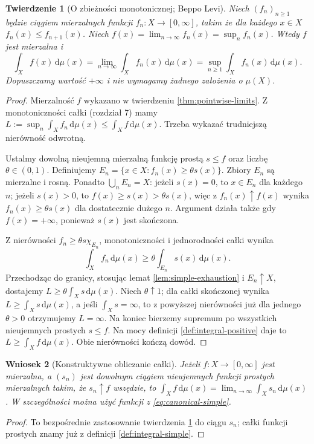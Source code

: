 \documentclass[11pt,a4paper,oneside]{book}
\numberwithin{equation}{chapter}
\theoremstyle{plain}
\newtheorem{twierdzenie}{Twierdzenie}[chapter]
\newtheorem{wniosek}[twierdzenie]{Wniosek}
\theoremstyle{definition}
\theoremstyle{remark}
\begin{document}
\begin{twierdzenie}[O zbieżności monotonicznej; Beppo Levi]
\label{thm:mct}
Niech $(f_n)_{n\ge1}$ będzie ciągiem mierzalnych funkcji
$f_n:X\to[0,\infty]$, takim że dla każdego $x\in X$
$f_n(x)\le f_{n+1}(x)$. Niech
$f(x)=\lim_{n\to\infty}f_n(x)=\sup_nf_n(x)$.
Wtedy $f$ jest mierzalna i
\begin{equation}\label{eq:mct}
\int_Xf(x)\,\mathrm d\mu(x)
=\lim_{n\to\infty}\int_Xf_n(x)\,\mathrm d\mu(x)
=\sup_{n\ge1}\int_Xf_n(x)\,\mathrm d\mu(x).
\end{equation}
Dopuszczamy wartość $+\infty$ i nie wymagamy
żadnego założenia o $\mu(X)$.
\end{twierdzenie}
\begin{proof}
Mierzalność $f$ wykazano w twierdzeniu
\ref{thm:pointwise-limits}. Z monotoniczności całki
(rozdział 7) mamy
$L:=\sup_n\int_Xf_n\,\mathrm d\mu(x)\le
\int_Xf\,\mathrm d\mu(x)$.
Trzeba wykazać trudniejszą nierówność odwrotną.

Ustalmy dowolną nieujemną mierzalną funkcję prostą
$s\le f$ oraz liczbę $\theta\in(0,1)$.
Definiujemy
$E_n=\{x\in X:f_n(x)\ge\theta s(x)\}$.
Zbiory $E_n$ są mierzalne i rosną.
Ponadto $\bigcup_nE_n=X$: jeżeli $s(x)=0$,
to $x\in E_n$ dla każdego $n$; jeżeli $s(x)>0$,
to $f(x)\ge s(x)>\theta s(x)$, więc z
$f_n(x)\uparrow f(x)$ wynika $f_n(x)\ge\theta s(x)$
dla dostatecznie dużego $n$. Argument działa także
gdy $f(x)=+\infty$, ponieważ $s(x)$ jest skończona.

Z nierówności $f_n\ge\theta s\chi_{E_n}$,
monotoniczności i jednorodności całki wynika
\[
\int_Xf_n\,\mathrm d\mu(x)\ge
\theta\int_{E_n}s(x)\,\mathrm d\mu(x).
\]
Przechodząc do granicy, stosując lemat
\ref{lem:simple-exhaustion} i $E_n\uparrow X$,
dostajemy $L\ge\theta\int_Xs\,\mathrm d\mu(x)$.
Niech $\theta\uparrow1$; dla całki skończonej
wynika $L\ge\int_Xs\,\mathrm d\mu(x)$, a jeśli
$\int_Xs=\infty$, to z powyższej nierówności
już dla jednego $\theta>0$ otrzymujemy $L=\infty$.
Na koniec bierzemy supremum po wszystkich
nieujemnych prostych $s\le f$. Na mocy definicji
\ref{def:integral-positive} daje to
$L\ge\int_Xf\,\mathrm d\mu(x)$. Obie nierówności
kończą dowód.
\end{proof}

\begin{wniosek}[Konstruktywne obliczanie całki]
\label{cor:simple-approx-integral}
Jeżeli $f:X\to[0,\infty]$ jest mierzalna, a
$(s_n)$ jest \emph{dowolnym} ciągiem nieujemnych
funkcji prostych mierzalnych takim, że $s_n\uparrow f$
wszędzie, to
$\int_Xf\,\mathrm d\mu(x)=
\lim_{n\to\infty}\int_Xs_n\,\mathrm d\mu(x)$.
W szczególności można użyć funkcji z
\eqref{eq:canonical-simple}.
\end{wniosek}
\begin{proof}
To bezpośrednie zastosowanie twierdzenia
\ref{thm:mct} do ciągu $s_n$; całki funkcji prostych
znamy już z definicji \ref{def:integral-simple}.
\end{proof}
\end{document}
